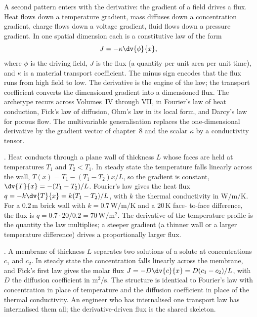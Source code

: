 \begin{archetype}
A second pattern enters with the derivative: the gradient of a
field drives a flux. Heat flows down a temperature gradient, mass
diffuses down a concentration gradient, charge flows down a voltage
gradient, fluid flows down a pressure gradient. In one spatial
dimension each is a constitutive law of the form
\[
J = -\kappa \dv{\phi}{x},
\]
where $\phi$ is the driving field, $J$ is the flux (a quantity per
unit area per unit time), and $\kappa$ is a material transport
coefficient. The minus sign encodes that the flux runs from high
field to low. The derivative is the engine of the law; the
transport coefficient converts the dimensioned gradient into a
dimensioned flux. The archetype recurs across Volumes~IV through
VII, in Fourier's law of heat conduction, Fick's law of diffusion,
Ohm's law in its local form, and Darcy's law for porous flow. The
multivariable generalisation replaces the one-dimensional
derivative by the gradient vector of chapter~8 and the scalar
$\kappa$ by a conductivity tensor.
\end{archetype}

. Heat conducts through a plane
wall of thickness $L$ whose faces are held at temperatures $T_{1}$
and $T_{2} < T_{1}$. In steady state the temperature falls linearly
across the wall, $T(x) = T_{1} - (T_{1} - T_{2}) x / L$, so the
gradient is constant, $\dv{T}{x} = -(T_{1} - T_{2})/L$. Fourier's
law gives the heat flux $q = -k \dv{T}{x} = k (T_{1} - T_{2})/L$,
with $k$ the thermal conductivity in $\si{\watt\per\meter\per
\kelvin}$. For a $0.2 \,\si{\meter}$ brick wall with $k = 0.7
\,\si{\watt\per\meter\per\kelvin}$ and a $20 \,\si{\kelvin}$ face-
to-face difference, the flux is $q = 0.7 \cdot 20 / 0.2 = 70
\,\si{\watt\per\meter\squared}$. The derivative of the temperature
profile is the quantity the law multiplies; a steeper gradient (a
thinner wall or a larger temperature difference) drives a
proportionally larger flux.

. A membrane of thickness $L$
separates two solutions of a solute at concentrations $c_{1}$ and
$c_{2}$. In steady state the concentration falls linearly across
the membrane, and Fick's first law gives the molar flux $J = -D
\dv{c}{x} = D (c_{1} - c_{2})/L$, with $D$ the diffusion
coefficient in $\si{\meter\squared\per\second}$. The structure is
identical to Fourier's law with concentration in place of
temperature and the diffusion coefficient in place of the thermal
conductivity. An engineer who has internalised one transport law
has internalised them all; the derivative-driven flux is the
shared skeleton.

